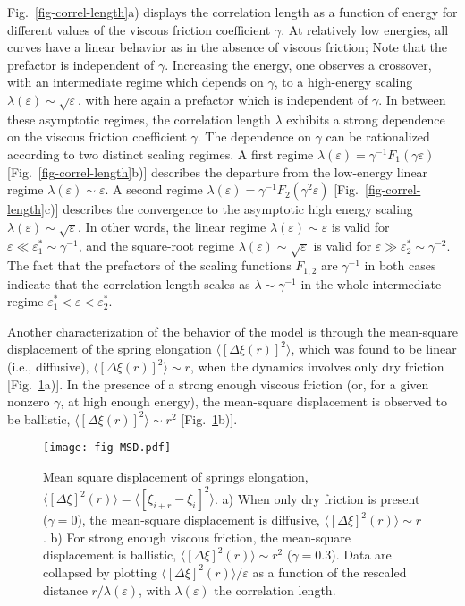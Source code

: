 \documentclass[prl,twocolumn,floats,floatfix,aps,superscriptaddress,showpacs]{revtex4-1}
\newcommand{\ve}{\varepsilon}
\begin{document}
%
%
Fig.~\ref{fig-correl-length}a) displays the correlation length as a function of energy for
different values of the viscous friction coefficient $\gamma$.
At relatively low energies,
all curves have a linear behavior as in the absence of viscous friction;
Note that the prefactor is independent of $\gamma$.
Increasing the energy, one observes a crossover, with
an intermediate regime which depends on $\gamma$, to a high-energy
scaling $\lambda(\ve) \sim \sqrt{\ve}$, with here again a prefactor which is independent of $\gamma$.
In between these asymptotic regimes, the correlation length $\lambda$ exhibits a strong dependence on the viscous friction coefficient $\gamma$.
The dependence on $\gamma$ can be rationalized according to two distinct scaling regimes. A first regime $\lambda(\ve) = \gamma^{-1} F_1(\gamma \ve)$
[Fig.~\ref{fig-correl-length}b)] describes the departure from the low-energy linear regime $\lambda(\ve) \sim \ve$.
A second regime $\lambda(\ve) = \gamma^{-1} F_2(\gamma^2 \ve)$
[Fig.~\ref{fig-correl-length}c)] describes the convergence to the asymptotic high energy scaling $\lambda(\ve) \sim \sqrt{\ve}$.
In other words, the linear regime $\lambda(\ve) \sim \ve$ is valid
for $\ve \ll \ve_1^* \sim \gamma^{-1}$, and the square-root regime
$\lambda(\ve) \sim \sqrt{\ve}$ is valid for $\ve \gg \ve_2^* \sim \gamma^{-2}$.
The fact that the prefactors of the scaling functions $F_{1,2}$ are 
$\gamma^{-1}$ in both cases indicate that the correlation length scales as 
$\lambda \sim \gamma^{-1}$ in the whole intermediate regime
$\ve_1^* < \ve < \ve_2^*$.

Another characterization of the behavior of the model is through the mean-square displacement of the spring elongation $\langle[\Delta \xi(r)]^2\rangle$,
which was found to be linear (i.e., diffusive), $\langle[\Delta \xi(r)]^2\rangle \sim r$, when the dynamics involves only dry friction [Fig.~\ref{fig-MSD}a)].
In the presence of a strong enough viscous friction (or, for a given nonzero $\gamma$, at high enough energy), the mean-square displacement is observed to be ballistic,  $\langle[\Delta \xi(r)]^2\rangle \sim r^2$ [Fig.~\ref{fig-MSD}b)].


\begin{figure}[t!]
  \texttt{[image: fig-MSD.pdf]}
  \caption{Mean square displacement of springs elongation,
  $\langle [\Delta \xi]^2(r) \rangle=\langle [ \xi_{i+r}-\xi_i]^2 \rangle $.
a) When only dry friction is present ($\gamma=0$), the mean-square displacement is diffusive, $\langle [\Delta \xi]^2(r) \rangle \sim r$.
b) For strong enough viscous friction, the mean-square displacement is ballistic, $\langle [\Delta \xi]^2(r) \rangle \sim r^2$ ($\gamma=0.3$).
Data are collapsed by plotting $\langle [\Delta \xi]^2(r) \rangle /\ve$
as a function of the rescaled distance $r/\lambda(\ve)$, with $\lambda(\ve)$ the correlation length.}
  \label{fig-MSD}
\end{figure}
\end{document}
